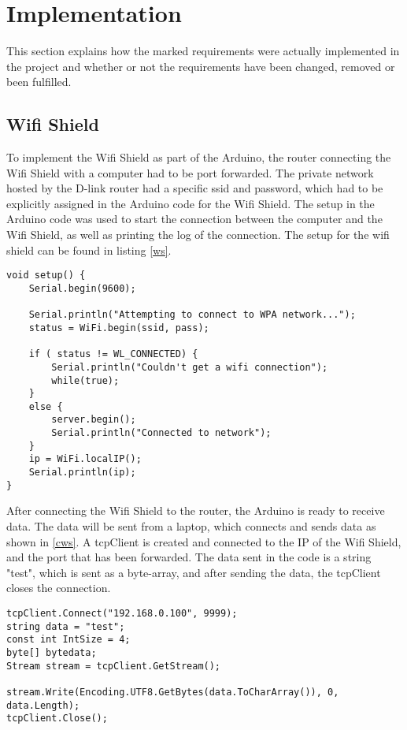 \section{Implementation}
\label{sec:i2Implementation}
This section explains how the marked requirements were actually implemented in the project and whether or not the requirements have been changed, removed or been fulfilled. 

\subsection{Wifi Shield}
\label{sec:Wifi Shield Implementation}
To implement the Wifi Shield as part of the Arduino, the router connecting the Wifi Shield with a computer had to be port forwarded. The private network hosted by the D-link router had a specific ssid and password, which had to be explicitly assigned in the Arduino code for the Wifi Shield. The setup in the Arduino code was used to start the connection between the computer and the Wifi Shield, as well as printing the log of the connection. The setup for the wifi shield can be found in listing \ref{ws}.

\begin{lstlisting}[caption={Connecting the Wifi shield to the network}, label={ws}]
void setup() {
	Serial.begin(9600);

	Serial.println("Attempting to connect to WPA network...");
	status = WiFi.begin(ssid, pass);

	if ( status != WL_CONNECTED) { 
		Serial.println("Couldn't get a wifi connection");
		while(true);
	} 
	else {
		server.begin();
		Serial.println("Connected to network");
	}
	ip = WiFi.localIP();
	Serial.println(ip);
}
\end{lstlisting}

After connecting the Wifi Shield to the router, the Arduino is ready to receive data. The data will be sent from a laptop, which connects and sends data as shown in \ref{cws}. A tcpClient is created and connected to the IP of the Wifi Shield, and the port that has been forwarded. The data sent in the code is a string "test", which is sent as a byte-array, and after sending the data, the tcpClient closes the connection.

\begin{lstlisting}[caption={Connecting the computer to the Wifi Shield}, label={cws}]
tcpClient.Connect("192.168.0.100", 9999);
string data = "test";
const int IntSize = 4;
byte[] bytedata;
Stream stream = tcpClient.GetStream();

stream.Write(Encoding.UTF8.GetBytes(data.ToCharArray()), 0, data.Length);
tcpClient.Close();
\end{lstlisting}

